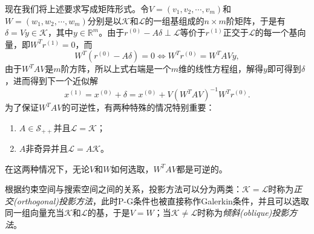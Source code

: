 \documentclass[a4paper,10pt]{ctexart}
\begin{document}
现在我们将上述要求写成矩阵形式。令$ V = (v_1, v_2,\cdots ,v_m) $和$ W = (w_1,w_2,\cdots ,w_m) $分别是以$ \mathcal{K} $和$ \mathcal{L} $的一组基组成的$ n\times m $阶矩阵，于是有$ \delta = Vy\in \mathcal{K} $，其中$ y\in \mathbb{R}^m $。由于$ r^{(0)} - A\delta\perp \mathcal{L} $等价于$ r^{(1)} $正交于$ \mathcal{L} $的每一个基向量，即$ W^Tr^{(1)} = 0 $，而
\[
    W^T (r^{(0)} - A\delta) = 0 \iff W^T r^{(0)} = W^T A V y,
\]
由于$ W^T A V $是$ m $阶方阵，所以上式右端是一个$ m $维的线性方程组，解得$ y $即可得到$ \delta $，进而得到下一个近似解
\begin{equation}\label{eq:generalprojection}
    x^{(1)} = x^{(0)} + \delta = x^{(0)} + V(W^TAV)^{-1}W^T r^{(0)}.
\end{equation}
为了保证$ W^T A V $的可逆性，有两种特殊的情况特别重要：
\begin{enumerate}
    \item $ A\in \mathcal{S}_{++} $并且$ \mathcal{L} = \mathcal{K} $；
    \item $ A $非奇异并且$ \mathcal{L} = A\mathcal{K} $。
\end{enumerate}
在这两种情况下，无论$ V $和$ W $如何选取，$ W^T A V $都是可逆的。

根据约束空间与搜索空间之间的关系，投影方法可以分为两类：$ \mathcal{K} = \mathcal{L} $时称为\emph{正交(orthogonal)投影方法}，此时P-G条件也被直接称作Galerkin条件，并且可以选取同一组向量充当$ \mathcal{K} $和$ \mathcal{L} $的基，于是$ V=W $；当$ \mathcal{K} \ne \mathcal{L} $时称为\emph{倾斜(oblique)投影方法}。
\end{document}
